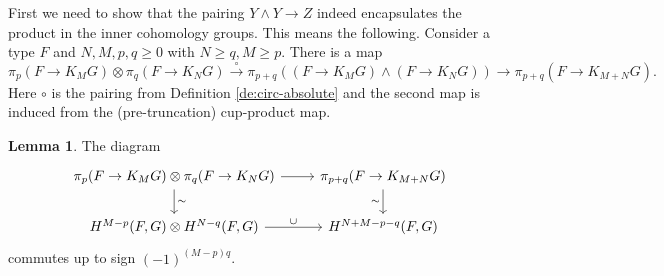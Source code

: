 \documentclass{amsart}
\theoremstyle{definition}
\newtheorem{lem}[theorem]{Lemma}
\begin{document}
First we need to show that the pairing $Y \wedge Y \to Z$ indeed encapsulates the product in the inner cohomology groups. This means the following. Consider a type $F$ and $N, M, p, q \geq 0$ with $N \geq q, M \geq p$. There is a map
$$\pi_p (F \to K_M G) \otimes \pi_q (F \to K_N G) \xrightarrow{\circ} \pi_{p+q} ((F \to K_M G) \wedge (F \to K_N G)) \to \pi_{p+q}(F \to K_{M+N} G).$$
Here $\circ$ is the pairing from Definition \ref{de:circ-absolute} and the second map is induced from the (pre-truncation) cup-product map.
\begin{lem}\label{le:pairing-gives-inner-prod}
    The diagram
    \[\begin{tikzcd}
    	{\pi_p (F \to K_M G) \otimes \pi_q (F \to K_N G)} & {\pi_{p+q}(F \to K_{M+N}G)} \\
    	{H^{M-p}(F,G) \otimes H^{N-q}(F,G)} & {H^{N+M-p-q}(F,G)}
    	\arrow[from=1-1, to=1-2]
    	\arrow["\sim", from=1-1, to=2-1]
    	\arrow["\sim"', from=1-2, to=2-2]
    	\arrow["\cup", from=2-1, to=2-2]
    \end{tikzcd}\]
    commutes up to sign $(-1)^{(M-p)q}$.
\end{lem}
\end{document}
